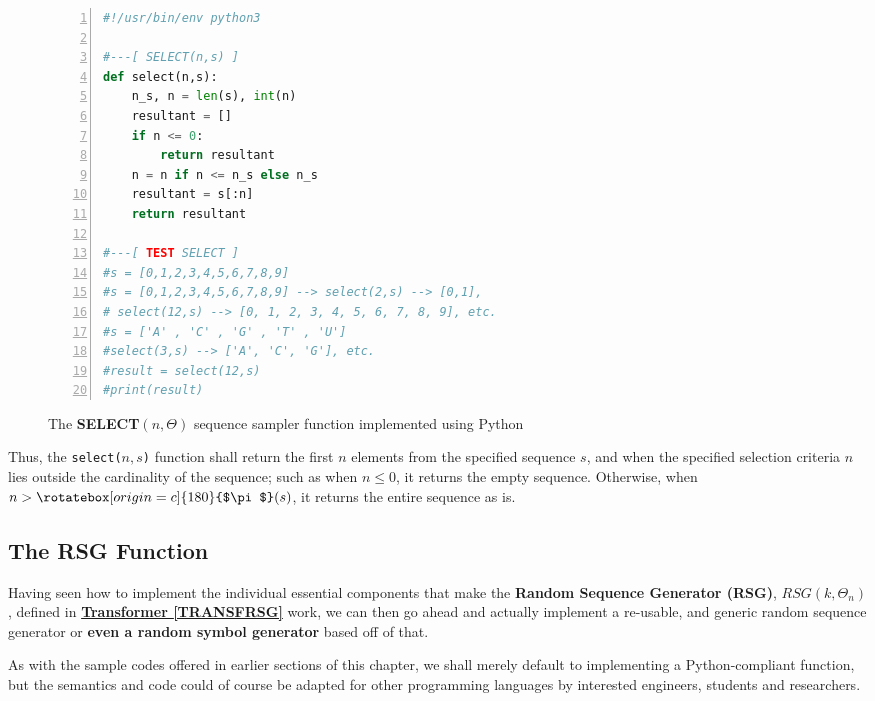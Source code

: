 \documentclass[a4paper, 18pt]{book} %
\newcommand{\invpi}{\rotatebox[origin=c]{180}{$\pi$}}
\begin{document}
\begin{figure}[H]
  \begin{center}
  \begin{lstlisting}[caption={The SELECT}, label={LST_SELECT}, language=Python, frame=single, numbers=left, basicstyle=\ttfamily,  commentstyle=\color{blue}, stringstyle=\color{orange}, keywordstyle=\color{purple}\bfseries]
#!/usr/bin/env python3

#---[ SELECT(n,s) ]
def select(n,s):
    n_s, n = len(s), int(n)
    resultant = []
    if n <= 0:
        return resultant
    n = n if n <= n_s else n_s
    resultant = s[:n]
    return resultant

#---[ TEST SELECT ]
#s = [0,1,2,3,4,5,6,7,8,9]
#s = [0,1,2,3,4,5,6,7,8,9] --> select(2,s) --> [0,1], 
# select(12,s) --> [0, 1, 2, 3, 4, 5, 6, 7, 8, 9], etc.
#s = ['A' , 'C' , 'G' , 'T' , 'U']
#select(3,s) --> ['A', 'C', 'G'], etc.
#result = select(12,s)
#print(result)
\end{lstlisting}
  \end{center}
  \caption{The \textbf{SELECT}$(n,\Theta)$ sequence sampler function implemented using Python}
\end{figure}

Thus, the \texttt{select($n,s$)} function shall return the first $n$ elements from the specified sequence $s$, and when the specified selection criteria $n$ lies outside the cardinality of the sequence; such as when $n \leq 0$, it returns the empty sequence. Otherwise, when $n > \invpi(s)$, it returns the entire sequence as is.

\subsection{The RSG Function}
\label{SECRSGFUNC}

Having seen how to implement the individual essential components that make the \textbf{Random Sequence Generator (RSG)}, $RSG(k,\Theta_n)$, defined in \textbf{\hyperref[TRANSFRSG]{Transformer \ref{TRANSFRSG}}} work, we can then go ahead and actually implement a re-usable, and generic random sequence generator or \textbf{even a random symbol generator} based off of that. 

As with the sample codes offered in earlier sections of this chapter, we shall merely default to implementing a Python-compliant function, but the semantics and code could of course be adapted for other programming languages by interested engineers, students and researchers.
\end{document}
